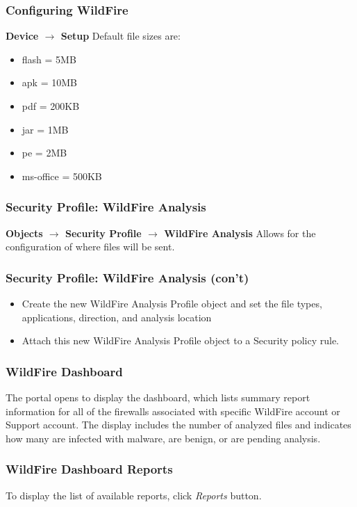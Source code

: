 \subsubsection{Configuring WildFire}
\textbf{Device $\rightarrow$ Setup}
Default file sizes are:
    \begin{itemize}
        \item flash = 5MB
        \item apk = 10MB
        \item pdf = 200KB
        \item jar = 1MB
        \item pe = 2MB
        \item ms-office = 500KB
    \end{itemize}

\subsubsection{Security Profile: WildFire Analysis}
\textbf{Objects $\rightarrow$ Security Profile $\rightarrow$ WildFire Analysis}
\newline
Allows for the configuration of where files will be sent.

\subsubsection{Security Profile: WildFire Analysis (con't)}
    \begin{itemize}
        \item Create the new WildFire Analysis Profile object and set the file types, applications, direction, and analysis location
        \item Attach this new WildFire Analysis Profile object to a Security policy rule.
    \end{itemize}

\subsubsection{WildFire Dashboard}
The portal opens to display the dashboard, which lists summary report information for all of the firewalls associated with specific WildFire account or Support account.
The display includes the number of analyzed files and indicates how many are infected with malware, are benign, or are pending analysis.

\subsubsection{WildFire Dashboard Reports}
To display the list of available reports, click \textit{Reports} button.

